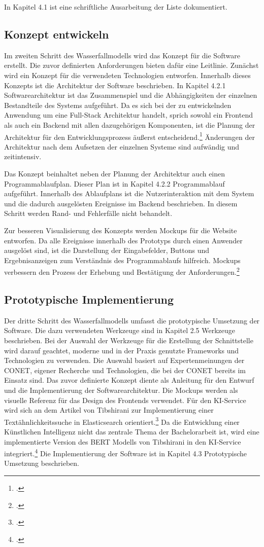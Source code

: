 In Kapitel 4.1 ist eine schriftliche Ausarbeitung der Liste dokumentiert.

\subsection{Konzept entwickeln}
Im zweiten Schritt des Wasserfallmodells wird das Konzept für die Software erstellt. Die zuvor definierten Anforderungen bieten dafür eine Leitlinie. Zunächst wird ein Konzept für die verwendeten Technologien entworfen. Innerhalb dieses Konzepts ist die Architektur der Software beschrieben. In Kapitel 4.2.1 \glqq Softwarearchitektur\grqq{} ist das Zusammenspiel und die Abhängigkeiten der einzelnen Bestandteile des Systems aufgeführt. Da es sich bei der zu entwickelnden Anwendung um eine Full-Stack Architektur handelt, sprich sowohl ein Frontend als auch ein Backend mit allen dazugehörigen Komponenten, ist die Planung der Architektur für den Entwicklungsprozess äußerst entscheidend.\footcite{taivalsaari2021full} Änderungen der Architektur nach dem Aufsetzen der einzelnen Systeme sind aufwändig und zeitintensiv.

Das Konzept beinhaltet neben der Planung der Architektur auch einen Programmablaufplan. Dieser Plan ist in Kapitel 4.2.2 \glqq Programmablauf\grqq{} aufgeführt. Innerhalb des Ablaufplans ist die Nutzerinteraktion mit dem System und die dadurch ausgelösten Ereignisse im Backend beschrieben. In diesem Schritt werden Rand- und Fehlerfälle nicht behandelt.

Zur besseren Visualisierung des Konzepts werden Mockups für die Website entworfen. Da alle Ereignisse innerhalb des Prototyps durch einen Anwender ausgelöst sind, ist die Darstellung der Eingabefelder, Buttons und Ergebnisanzeigen zum Verständnis des Programmablaufs hilfreich. Mockups verbessern den Prozess der Erhebung und Bestätigung der Anforderungen.\footcite{rivero2010mockups}

\subsection{Prototypische Implementierung}
Der dritte Schritt des Wasserfallmodells umfasst die prototypische Umsetzung der Software. Die dazu verwendeten Werkzeuge sind in Kapitel 2.5 \glqq Werkzeuge\grqq{} beschrieben. Bei der Auswahl der Werkzeuge für die Erstellung der Schnittstelle wird darauf geachtet, moderne und in der Praxis genutzte Frameworks und Technologien zu verwenden. Die Auswahl basiert auf Expertenmeinungen der CONET, eigener Recherche und Technologien, die bei der CONET bereits im Einsatz sind. Das zuvor definierte Konzept diente als Anleitung für den Entwurf und die Implementierung der Softwarearchitektur. Die Mockups werden als visuelle Referenz für das Design des Frontends verwendet. Für den KI-Service wird sich an dem Artikel von Tibshirani zur Implementierung einer Textähnlichkeitssuche in Elasticsearch orientiert.\footcite{tibshirani2019ki} Da die Entwicklung einer Künstlichen Intelligenz nicht das zentrale Thema der Bachelorarbeit ist, wird eine implementierte Version des BERT Modells von Tibshirani in den KI-Service integriert.\footcite{tibshirani2020github} Die Implementierung der Software ist in Kapitel 4.3 \glqq Prototypische Umsetzung\grqq{} beschrieben.

